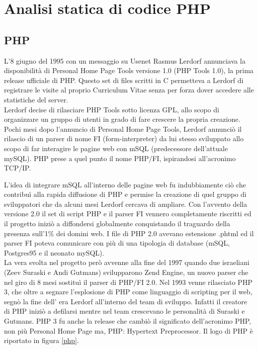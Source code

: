 \chapter{Analisi statica di codice PHP}

\begin{epigraphs}
\end{epigraphs}

\section{PHP}
L’8 giugno del 1995 con un messaggio su Usenet Rasmus Lerdorf annunciava la disponibilità di Personal Home Page Tools versione 1.0 (PHP Tools 1.0), la prima release ufficiale di PHP\cite{php}. Questo set di files scritti in C permetteva a Lerdorf di registrare le visite al proprio Curriculum Vitae senza per forza dover accedere alle statistiche del server.\\
Lerdorf decise di rilasciare PHP Tools sotto licenza GPL, allo scopo di organizzare un gruppo di utenti in grado di fare crescere la propria creazione. Pochi mesi dopo l’annuncio di Personal Home Page Tools, Lerdorf annunciò il rilascio di un parser di nome FI (form-interpreter) da lui stesso sviluppato allo scopo di far interagire le pagine web con mSQL (predecessore dell’attuale mySQL). PHP prese a quel punto il nome PHP/FI, ispirandosi all'acronimo TCP/IP.

L'idea di integrare mSQL all’interno delle pagine web fu indubbiamente ciò che contribuì alla rapida diffusione di PHP e permise la creazione di quel gruppo di sviluppatori che da alcuni mesi Lerdorf cercava di ampliare.
Con l’avvento della versione 2.0 il set di script PHP e il parser FI vennero completamente riscritti ed il progetto iniziò a diffondersi globalmente conquistando il traguardo della presenza sull’1\% dei domini web. I file di PHP 2.0 avevano estensione .phtml ed il parser FI poteva comunicare con più di una tipologia di database (mSQL, Postgres95 e il neonato mySQL).\\
La vera svolta nel progetto però avvenne alla fine del 1997 quando due israeliani (Zeev Suraski e Andi Gutmans) svilupparono Zend Engine, un nuovo parser che nel giro di 8 mesi sostituì il parser di PHP/FI 2.0. Nel 1993 venne rilasciato PHP 3, che oltre a segnare l’esplosione di PHP come linguaggio di scripting per il web, segnò la fine dell’ era Lerdorf all’interno del team di sviluppo. Infatti il creatore di PHP iniziò a defilarsi mentre nel team crescevano le personalità di Suraski e Gutmans. PHP 3 fu anche la release che cambiò il significato dell'acronimo PHP, non più Personal Home Page ma, PHP: Hypertext Preprocessor. Il logo di PHP è riportato in figura \ref{php}.\\

